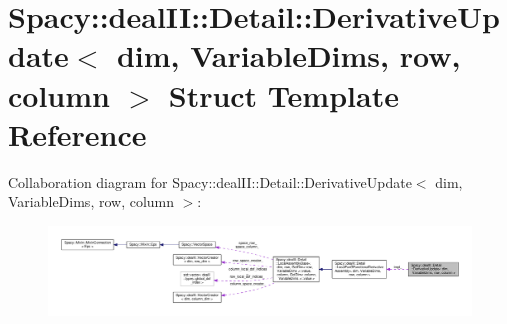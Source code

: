 \hypertarget{structSpacy_1_1dealII_1_1Detail_1_1DerivativeUpdate}{\section{Spacy\-:\-:deal\-I\-I\-:\-:Detail\-:\-:Derivative\-Update$<$ dim, Variable\-Dims, row, column $>$ Struct Template Reference}
\label{structSpacy_1_1dealII_1_1Detail_1_1DerivativeUpdate}
}


Collaboration diagram for Spacy\-:\-:deal\-I\-I\-:\-:Detail\-:\-:Derivative\-Update$<$ dim, Variable\-Dims, row, column $>$\-:
\nopagebreak
\begin{figure}[H]
\begin{center}
\leavevmode
\includegraphics[width=350pt]{structSpacy_1_1dealII_1_1Detail_1_1DerivativeUpdate__coll__graph}
\end{center}
\end{figure}
